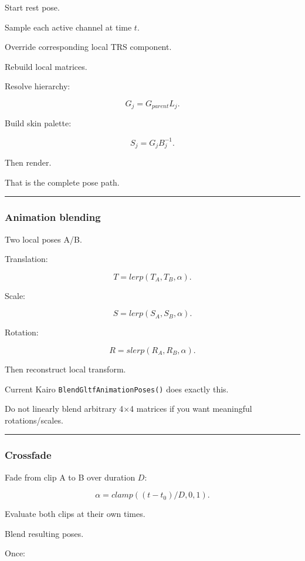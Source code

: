 Start rest pose.

Sample each active channel at time \(t\).

Override corresponding local TRS component.

Rebuild local matrices.

Resolve hierarchy:

\[
G_j=
G_{parent}L_j.
\]

Build skin palette:

\[
S_j=
G_jB_j^{-1}.
\]

Then render.

That is the complete pose path.

\begin{center}\rule{0.5\linewidth}{0.5pt}\end{center}

\subsubsection{Animation blending}\label{animation-blending}

Two local poses A/B.

Translation:

\[
T=
lerp(T_A,T_B,\alpha).
\]

Scale:

\[
S=
lerp(S_A,S_B,\alpha).
\]

Rotation:

\[
R=
slerp(R_A,R_B,\alpha).
\]

Then reconstruct local transform.

Current Kairo \texttt{BlendGltfAnimationPoses()} does exactly this.

Do not linearly blend arbitrary 4×4 matrices if you want meaningful rotations/scales.

\begin{center}\rule{0.5\linewidth}{0.5pt}\end{center}

\subsubsection{Crossfade}\label{crossfade}

Fade from clip A to B over duration \(D\):

\[
\alpha=
clamp(
(t-t_0)/D,
0,1
).
\]

Evaluate both clips at their own times.

Blend resulting poses.

Once:

